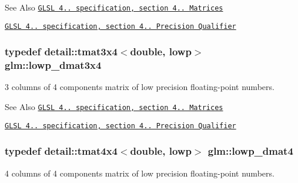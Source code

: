 \begin{DoxySeeAlso}{See Also}
\href{http://www.opengl.org/registry/doc/GLSLangSpec.4.20.8.pdf}{\tt G\-L\-S\-L 4.. specification, section 4.. Matrices} 

\href{http://www.opengl.org/registry/doc/GLSLangSpec.4.20.8.pdf}{\tt G\-L\-S\-L 4.. specification, section 4.. Precision Qualifier} 
\end{DoxySeeAlso}
\hypertarget{group__core__precision_ga4640e1d20ad705842525e79a4cc57b15}{
\subsubsection[{lowp\-\_\-dmat3x4}]{\setlength{\rightskip}{0pt plus 5cm}typedef detail\-::tmat3x4$<$double, lowp$>$ {\bf glm\-::lowp\-\_\-dmat3x4}}}\label{group__core__precision_ga4640e1d20ad705842525e79a4cc57b15}
3 columns of 4 components matrix of low precision floating-\/point numbers.

\begin{DoxySeeAlso}{See Also}
\href{http://www.opengl.org/registry/doc/GLSLangSpec.4.20.8.pdf}{\tt G\-L\-S\-L 4.. specification, section 4.. Matrices} 

\href{http://www.opengl.org/registry/doc/GLSLangSpec.4.20.8.pdf}{\tt G\-L\-S\-L 4.. specification, section 4.. Precision Qualifier} 
\end{DoxySeeAlso}
\hypertarget{group__core__precision_gaea69794db4e619881b77d37bf84b337e}{
\subsubsection[{lowp\-\_\-dmat4}]{\setlength{\rightskip}{0pt plus 5cm}typedef detail\-::tmat4x4$<$double, lowp$>$ {\bf glm\-::lowp\-\_\-dmat4}}}\label{group__core__precision_gaea69794db4e619881b77d37bf84b337e}
4 columns of 4 components matrix of low precision floating-\/point numbers.

